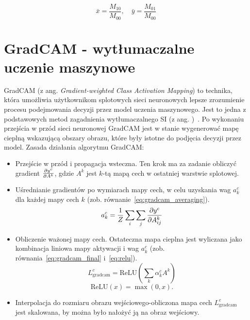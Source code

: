 \begin{equation}
    \bar{x} = \frac{M_{10}}{M_{00}}, \quad \bar{y} = \frac{M_{01}}{M_{00}}\label{eq:centroid}
\end{equation}


\section{GradCAM - wytłumaczalne uczenie maszynowe}

GradCAM (z ang. \textit{Gradient-weighted Class Activation Mapping}) to technika, która umożliwia użytkownikom splotowych sieci neuronowych lepsze zrozumienie procesu podejmowania decyzji przez model uczenia maszynowego.
Jest to jedna z podstawowych metod zagadnienia wytłumaczalnego SI (z ang. )~\cite{xai}.
Po wykonaniu przejścia w przód sieci neuronowej GradCAM jest w stanie wygenerować mapę cieplną wskazującą obszary obrazu, które były istotne do podjęcia decyzji przez model.
Zasada działania algorytmu GradCAM:
\begin{itemize}
    \item Przejście w przód i propagacja wsteczna.
    Ten krok ma za zadanie obliczyć gradient $\frac{\partial{{y^c}}}{\partial{{A^k}}}$, gdzie $A^k$ jest $k$-tą mapą cech w ostatniej warstwie splotowej.
    \item Uśrednianie gradientów po wymiarach mapy cech, w celu uzyskania wag $a^c_k$ dla każdej mapy cech $k$ (zob.
    równanie~\ref{eq:gradcam_averaging}).
    \begin{equation}
        a^c_k = \frac{1}{Z} \sum_i \sum_j \frac{\partial{{y^c}}}{\partial{{A^k_{ij}}}}\label{eq:gradcam_averaging}
    \end{equation}
    \item Obliczenie ważonej mapy cech.
    Ostateczna mapa cieplna jest wyliczana jako kombinacja liniowa mapy aktywacji i wag $a^c_k$ (zob.
    równania~\ref{eq:gradcam_final} i~\ref{eq:relu}).
    \begin{equation}
        L^c_{\text{gradcam}} = \text{ReLU} \left( \sum_k \alpha^c_k A^k \right)\label{eq:gradcam_final}
    \end{equation}
    \begin{equation}
        \text{ReLU}(x) = \max(0, x).\label{eq:relu}
    \end{equation}
    \item Interpolacja do rozmiaru obrazu wejściowego-obliczona mapa cech $L^c_{\text{gradcam}}$ jest skalowana, by można było nałożyć ją na obraz wejściowy.
\end{itemize}

